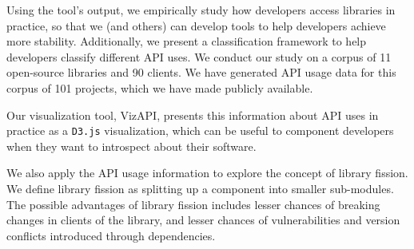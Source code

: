 Using the tool's output, we empirically study how developers access libraries in practice, so that we (and others) can develop tools to help developers achieve more stability. Additionally, we present a classification framework to help developers classify different API uses. We conduct our study on a corpus of 11 open-source libraries and 90 clients. We have generated API usage data for this corpus of 101 projects, which we have made publicly available. 

Our visualization tool, VizAPI, presents this information about API uses in practice as a \texttt{D3.js} visualization, which can be useful to component developers when they want to introspect about their software. 

We also apply the API usage information to explore the concept of library fission. We define library fission as splitting up a component into smaller sub-modules. The possible advantages of library fission includes lesser chances of breaking changes in clients of the library, and lesser chances of vulnerabilities and version conflicts introduced through dependencies.